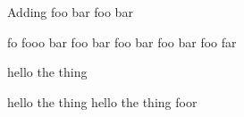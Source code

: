 Adding foo bar foo bar

fo fooo bar foo bar foo bar foo bar foo far

hello the thing

hello the thing hello the thing foor